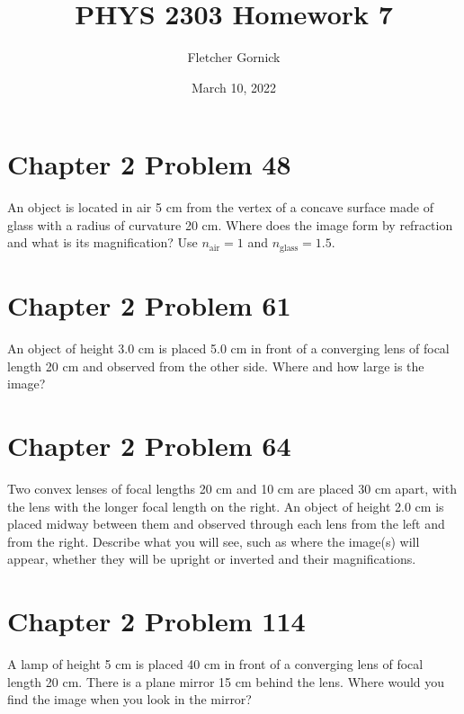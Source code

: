 \documentclass[11pt]{article}
\title{\vspace{-1.0cm}PHYS 2303 Homework 7}
\author{Fletcher Gornick}
\date{March 10, 2022}
\begin{document}
 \maketitle

 \section*{Chapter 2 Problem 48}
  An object is located in air 5 cm from the vertex of a concave surface made of glass 
  with a radius of curvature 20 cm. Where does the image form by refraction and what 
  is its magnification? Use \(n_{\text{air}} = 1\) and \(n_{\text{glass}} = 1.5\).
 \newpage

 \section*{Chapter 2 Problem 61}
  An object of height 3.0 cm is placed 5.0 cm in front of a converging lens of focal 
  length 20 cm and observed from the other side. Where and how large is the image?
 \newpage

 \section*{Chapter 2 Problem 64}
  Two convex lenses of focal lengths 20 cm and 10 cm are placed 30 cm apart, with the 
  lens with the longer focal length on the right. An object of height 2.0 cm is placed 
  midway between them and observed through each lens from the left and from the right. 
  Describe what you will see, such as where the image(s) will appear, whether they will 
  be upright or inverted and their magnifications.
 \newpage

 \section*{Chapter 2 Problem 114}
  A lamp of height 5 cm is placed 40 cm in front of a converging lens of focal length 
  20 cm. There is a plane mirror 15 cm behind the lens. Where would you find the image 
  when you look in the mirror?
\end{document}
